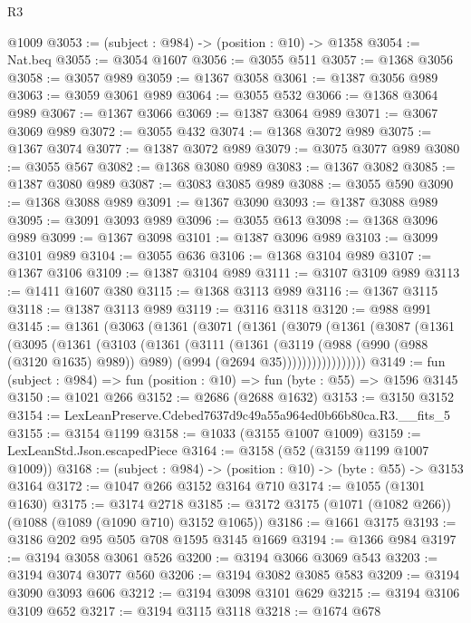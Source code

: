 \begin{lexlean}{R3}
\begin{coremodule}
    @1009
@3053 := (subject : @984) -> (position : @10) -> @1358
@3054 := Nat.beq
@3055 := @3054 @1607
@3056 := @3055 @511
@3057 := @1368 @3056
@3058 := @3057 @989
@3059 := @1367 @3058
@3061 := @1387 @3056 @989
@3063 := @3059 @3061 @989
@3064 := @3055 @532
@3066 := @1368 @3064 @989
@3067 := @1367 @3066
@3069 := @1387 @3064 @989
@3071 := @3067 @3069 @989
@3072 := @3055 @432
@3074 := @1368 @3072 @989
@3075 := @1367 @3074
@3077 := @1387 @3072 @989
@3079 := @3075 @3077 @989
@3080 := @3055 @567
@3082 := @1368 @3080 @989
@3083 := @1367 @3082
@3085 := @1387 @3080 @989
@3087 := @3083 @3085 @989
@3088 := @3055 @590
@3090 := @1368 @3088 @989
@3091 := @1367 @3090
@3093 := @1387 @3088 @989
@3095 := @3091 @3093 @989
@3096 := @3055 @613
@3098 := @1368 @3096 @989
@3099 := @1367 @3098
@3101 := @1387 @3096 @989
@3103 := @3099 @3101 @989
@3104 := @3055 @636
@3106 := @1368 @3104 @989
@3107 := @1367 @3106
@3109 := @1387 @3104 @989
@3111 := @3107 @3109 @989
@3113 := @1411 @1607 @380
@3115 := @1368 @3113 @989
@3116 := @1367 @3115
@3118 := @1387 @3113 @989
@3119 := @3116 @3118
@3120 := @988 @991
@3145 := @1361
    (@3063
      (@1361
        (@3071
          (@1361
            (@3079
              (@1361
                (@3087
                  (@1361
                    (@3095
                      (@1361
                        (@3103
                          (@1361
                            (@3111
                              (@1361
                                (@3119
                                  (@988 (@990 (@988 (@3120 @1635) @989)) @989)
                                  (@994 (@2694 @35)))))))))))))))))
@3149 := fun (subject : @984) => fun (position : @10) => fun (byte : @55) => @1596 @3145
@3150 := @1021 @266
@3152 := @2686 (@2688 @1632)
@3153 := @3150 @3152
@3154 := LexLeanPreserve.Cdebed7637d9c49a55a964ed0b66b80ca.R3.__fits_5
@3155 := @3154 @1199
@3158 := @1033 (@3155 @1007 @1009)
@3159 := LexLeanStd.Json.escapedPiece
@3164 := @3158 (@52 (@3159 @1199 @1007 @1009))
@3168 := (subject : @984) -> (position : @10) -> (byte : @55) -> @3153 @3164
@3172 := @1047 @266 @3152 @3164 @710
@3174 := @1055 (@1301 @1630)
@3175 := @3174 @2718
@3185 := @3172 @3175 (@1071 (@1082 @266)) (@1088 (@1089 (@1090 @710) @3152 @1065))
@3186 := @1661 @3175
@3193 := @3186 @202 @95 @505 @708 @1595 @3145 @1669
@3194 := @1366 @984
@3197 := @3194 @3058 @3061 @526
@3200 := @3194 @3066 @3069 @543
@3203 := @3194 @3074 @3077 @560
@3206 := @3194 @3082 @3085 @583
@3209 := @3194 @3090 @3093 @606
@3212 := @3194 @3098 @3101 @629
@3215 := @3194 @3106 @3109 @652
@3217 := @3194 @3115 @3118
@3218 := @1674 @678

\end{coremodule}
\end{lexlean}

